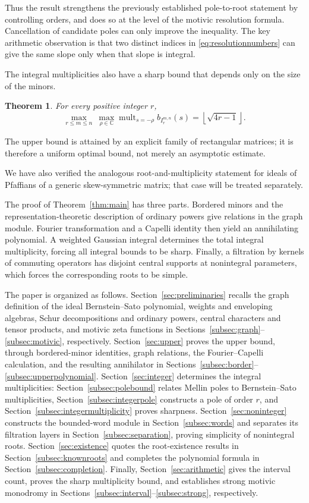 \documentclass[11pt,a4paper]{article}
\numberwithin{equation}{section}
\newtheorem{maintheorem}{Theorem}
\theoremstyle{definition}
\newcommand{\C}{\mathbb C}
\DeclareMathOperator{\mult}{mult}
\begin{document}
Thus the result strengthens the previously established pole-to-root
statement by controlling orders, and does so at the level of the
motivic resolution formula. Cancellation of candidate poles can only
improve the inequality. The key arithmetic observation is that two
distinct indices in \eqref{eq:resolutionnumbers} can give the same
slope only when that slope is integral.

The integral multiplicities also have a sharp bound that depends
only on the size of the minors.
\begin{maintheorem}\label{thm:sharpbound}
For every positive integer $r$,
\begin{equation}\label{eq:sharpbound}
\max_{r\le m\le n}\ \max_{\rho\in\C}
      \mult_{s=-\rho}b_{I_r^{m,n}}(s)
=\left\lfloor\sqrt{4r-1}\right\rfloor.
\end{equation}
\end{maintheorem}
The upper bound is attained by an explicit family of rectangular
matrices; it is therefore a uniform optimal bound, not merely an
asymptotic estimate.

We have also verified the analogous root-and-multiplicity statement
for ideals of Pfaffians of a generic skew-symmetric matrix; that case
will be treated separately.

The proof of Theorem~\ref{thm:main} has three parts. Bordered minors
and the representation-theoretic description of ordinary powers
give relations in the graph module. Fourier transformation and a
Capelli identity then yield an annihilating polynomial. A weighted
Gaussian integral determines the total integral multiplicity, forcing
all integral bounds to be sharp. Finally, a filtration by kernels of
commuting operators has disjoint central supports at nonintegral
parameters, which forces the corresponding roots to be simple.

The paper is organized as follows. Section~\ref{sec:preliminaries}
recalls the graph definition of the ideal Bernstein--Sato polynomial,
weights and enveloping algebras, Schur decompositions and ordinary
powers, central characters and tensor products, and motivic zeta
functions in Sections~\ref{subsec:graph}--\ref{subsec:motivic}, respectively.
Section~\ref{sec:upper} proves the upper bound, through bordered-minor
identities, graph relations, the Fourier--Capelli calculation, and
the resulting annihilator in
Sections~\ref{subsec:border}--\ref{subsec:upperpolynomial}.
Section~\ref{sec:integer} determines the integral multiplicities:
Section~\ref{subsec:polebound} relates Mellin poles to Bernstein--Sato
multiplicities, Section~\ref{subsec:integerpole} constructs a pole of
order $r$, and Section~\ref{subsec:integermultiplicity} proves sharpness.
Section~\ref{sec:noninteger} constructs the bounded-word module in
Section~\ref{subsec:words} and separates its filtration layers in
Section~\ref{subsec:separation}, proving simplicity of nonintegral roots.
Section~\ref{sec:existence} quotes the root-existence results in
Section~\ref{subsec:knownroots} and completes the polynomial formula in
Section~\ref{subsec:completion}.
Finally, Section~\ref{sec:arithmetic} gives the interval count, proves
the sharp multiplicity bound, and establishes strong motivic monodromy
in Sections~\ref{subsec:interval}--\ref{subsec:strong}, respectively.
\end{document}
